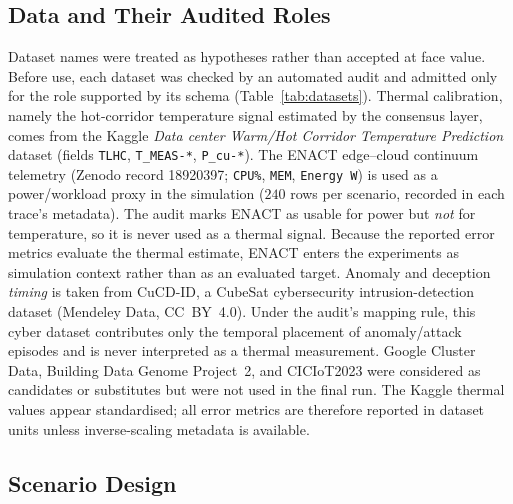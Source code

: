 \documentclass[smartcities,article,submit,moreauthors]{Definitions/mdpi}
\begin{document}
\subsection{Data and Their Audited Roles}
\label{sec:setup_data}

Dataset names were treated as hypotheses rather than accepted at face
value. Before use, each dataset was checked by an automated audit and
admitted only for the role supported by its schema
(Table~\ref{tab:datasets}). Thermal calibration, namely the hot-corridor
temperature signal estimated by the consensus layer, comes from the
Kaggle \emph{Data center Warm/Hot Corridor Temperature Prediction}
dataset (fields \texttt{TLHC}, \texttt{T\_MEAS-*}, \texttt{P\_cu-*}).
The ENACT edge--cloud continuum telemetry (Zenodo record 18920397;
\texttt{CPU\%}, \texttt{MEM}, \texttt{Energy\,W}) is used as a
power/workload proxy in the simulation ($240$ rows per scenario, recorded
in each trace's metadata). The audit marks ENACT as usable for power but
\emph{not} for temperature, so it is never used as a thermal signal.
Because the reported error metrics evaluate the thermal estimate, ENACT
enters the experiments as simulation context rather than as an evaluated
target. Anomaly and deception \emph{timing} is taken from CuCD-ID, a
CubeSat cybersecurity intrusion-detection dataset (Mendeley Data,
CC~BY~4.0). Under the audit's mapping rule, this cyber dataset contributes
only the temporal placement of anomaly/attack episodes and is never
interpreted as a thermal measurement. Google Cluster Data, Building Data
Genome Project~2, and CICIoT2023 were considered as candidates or
substitutes but were not used in the final run. The Kaggle thermal values
appear standardised; all error metrics are therefore reported in dataset
units unless inverse-scaling metadata is available.



\subsection{Scenario Design}
\label{sec:setup_scenarios}
\end{document}
